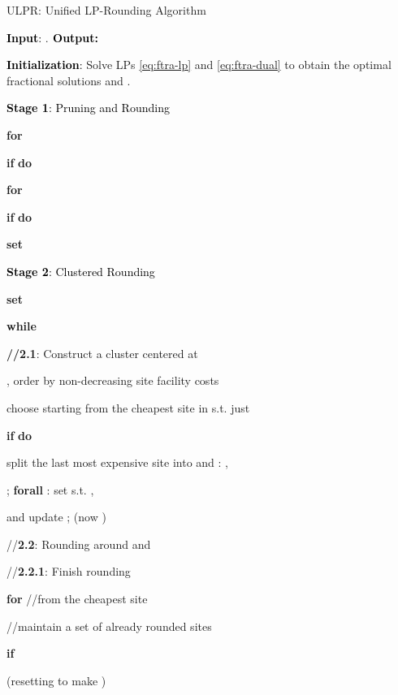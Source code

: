 \documentclass[10pt]{llncs}
\begin{document}
\begin{algorithm}[H]
\caption{ULPR: Unified LP-Rounding Algorithm}


\textbf{\textcolor{black}{Input}}\textcolor{black}{: }.\textbf{\textcolor{black}{{}
Output: }}

\textbf{\textcolor{black}{Initialization}}\textcolor{black}{: }Solve
LPs \eqref{eq:ftra-lp} and \eqref{eq:ftra-dual} to obtain the optimal
fractional solutions 
and .


\textbf{\textcolor{black}{Stage 1}}\textcolor{black}{: Pruning and
Rounding}

\textbf{for} 

\qquad{}\textbf{if}  \textbf{do}

\qquad{}\qquad{}

\qquad{}\qquad{}

\qquad{}\qquad{}\textbf{for}  

\qquad{}\qquad{}\qquad{}\textbf{if}  \textbf{do}

\qquad{}\qquad{}\qquad{}\qquad{}

\textbf{set} 

\medskip{}


\textbf{\textcolor{black}{Stage 2}}\textcolor{black}{: Clustered Rounding}

\textbf{set} 

\textbf{while }

\qquad{}\textbf{//2.1}: Construct a cluster  centered
at 

\qquad{},
order  by non-decreasing site facility costs

\qquad{}choose  starting
from the cheapest site in  s.t. just 

\qquad{}\textbf{if} 
\textbf{do}

\qquad{}\qquad{}split the last most expensive site 
into  and : , 

\qquad{}\qquad{};\textbf{
forall }:\textbf{ }set  s.t.
,  

\qquad{}\qquad{} and update ;\textbf{
}
(now )\medskip{}


\qquad{}//\textbf{2.2}: Rounding around  and 

\qquad{}//\textbf{2.2.1}: Finish rounding 

\qquad{}\textbf{for  }//from the cheapest site

\qquad{}\qquad{} 

\qquad{}\qquad{}
//maintain a set of already rounded sites

\qquad{}\qquad{}\textbf{if }

\qquad{}\qquad{}\qquad{}
(resetting  to make )


\end{algorithm}
\end{document}
